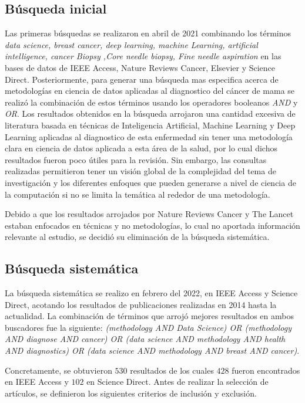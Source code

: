 \subsection{Búsqueda inicial}
Las primeras búsquedas se realizaron en abril de 2021 combinando los términos \textit{data science, breast cancer, deep learning, machine Learning, artificial intelligence, cancer Biopsy ,Core needle biopsy, Fine needle aspiration} en las bases de datos de IEEE Access, Nature Reviews Cancer, Elsevier y Science Direct. Posteriormente, para generar una búsqueda mas especifica acerca de metodologías en ciencia de datos aplicadas al diagnostico del cáncer de mama se realizó la combinación de estos términos usando los operadores booleanos \textit{AND} y \textit{OR}. Los resultados obtenidos en la búsqueda arrojaron una cantidad excesiva de literatura basada en técnicas de Inteligencia Artificial, Machine Learning y Deep Learning aplicadas al diagnostico de esta enfermedad sin tener una metodología clara en ciencia de datos aplicada a esta área de la salud, por lo cual dichos resultados fueron poco útiles para la revisión. Sin embargo, las consultas realizadas permitieron tener un visión global de la complejidad del tema de investigación y los diferentes enfoques que pueden generarse a nivel de ciencia de la computación si no se limita la temática al rededor de una metodología.

Debido a que los resultados arrojados por Nature Reviews Cancer y The Lancet estaban enfocados en técnicas y no metodologías, lo cual no aportada información relevante al estudio, se decidió su eliminación de la búsqueda sistemática.  

\subsection{Búsqueda sistemática}
La búsqueda sistemática se realizo en febrero del 2022, en IEEE Access y Science Direct, acotando los resultados de publicaciones realizadas en 2014 hasta la actualidad. La combinación de términos que arrojó mejores resultados en ambos buscadores fue la siguiente:
\textit{(methodology AND Data Science) OR (methodology AND diagnose AND cancer) OR (data science AND methodology AND health AND diagnostics) OR (data science AND methodology AND breast AND cancer)}.

Concretamente, se obtuvieron $530$ resultados de los cuales $428$ fueron encontrados en IEEE Access y $102$ en Science Direct. Antes de realizar la selección de artículos, se definieron los siguientes criterios de inclusión y exclusión. 

